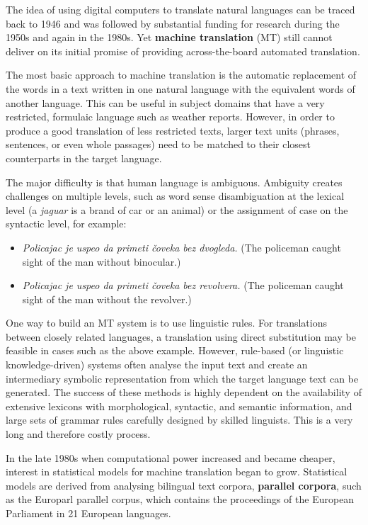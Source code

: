 {\begin{multicols}{2}
The idea of using digital computers to translate natural languages can be traced back to 1946 and was followed by substantial funding for research during the 1950s and again in the 1980s. Yet \textbf{machine translation} (MT) still cannot deliver on its initial promise of providing across-the-board automated translation.

The most basic approach to machine translation is the automatic replacement of the words in a text written in one natural language with the equivalent words of another language. This can be useful in subject domains that have a very restricted, formulaic language such as weather reports.  However, in order to produce a good translation of less restricted texts, larger text units (phrases, sentences, or even whole passages) need to be matched to their closest counterparts in the target language. 


The major difficulty is that human language is ambiguous. Ambiguity creates challenges on multiple levels, such as word sense disambiguation at the lexical level (a \textit{jaguar} is a brand of car or an animal) or the assignment of case on the syntactic level, for example:

\begin{itemize}
\item \textit{Policajac je uspeo da primeti čoveka bez dvogleda.} (The policeman caught sight of the man without binocular.)
\item \textit{Policajac je uspeo da primeti čoveka bez revolvera.} (The policeman caught sight of the man without the revolver.)
\end{itemize}


One way to build an MT system is to use linguistic rules. For translations between closely related languages, a translation using direct substitution may be feasible in cases such as the above example. However, rule-based (or linguistic knowledge-driven) systems often analyse the input text and create an intermediary symbolic representation from which the target language text can be generated. The success of these methods is highly dependent on the availability of extensive lexicons with morphological, syntactic, and semantic information, and large sets of grammar rules carefully designed by skilled linguists. This is a very long and therefore costly process.

In the late 1980s when computational power increased and became cheaper, interest in statistical models for machine translation began to grow. Statistical models are derived from analysing bilingual text corpora, \textbf{parallel corpora}, such as the Europarl parallel corpus, which contains the proceedings of the European Parliament in 21 European languages. 


\end{multicols}}
